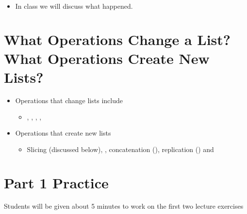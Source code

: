 \documentclass[letterpaper,10pt,english]{sphinxmanual}
\begin{document}
\begin{itemize}
\begin{sphinxVerbatim}[commandchars=\\\{\}]
  \PYG{p}{[}     \PYG{p}{]}

 
 
 
\end{sphinxVerbatim}

\item {} 
In class we will discuss what happened.

\end{itemize}


\section{What Operations Change a List? What Operations Create New Lists?}
\label{\detokenize{lecture_notes/lec10_lists2:what-operations-change-a-list-what-operations-create-new-lists}}\begin{itemize}
\item {} 
Operations that change lists include
\begin{itemize}
\item {} 
, , , , 

\end{itemize}

\item {} 
Operations that create new lists
\begin{itemize}
\item {} 
Slicing (discussed below), , concatenation (\sphinxcode{\sphinxupquote{+}}),
replication (\sphinxcode{\sphinxupquote{*}}) and 

\end{itemize}

\end{itemize}


\section{Part 1 Practice}
\label{\detokenize{lecture_notes/lec10_lists2:part-1-practice}}
Students will be given about 5 minutes to work on the first two
lecture exercises
\end{document}
